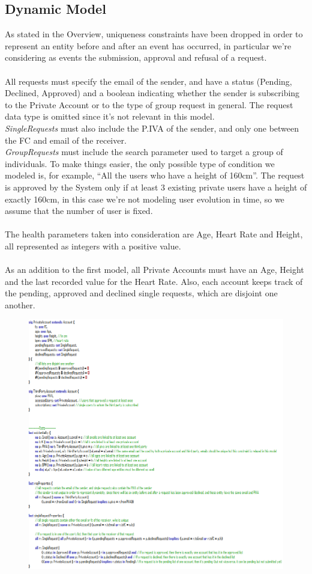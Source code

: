 \documentclass[titlepage]{article}
\begin{document}
		\subsection{Dynamic Model}
		As stated in the Overview, uniqueness constraints have been dropped in order to represent an entity before and 		after an event has occurred, in particular we’re considering as events the submission, approval and refusal of a 		request.\\
		\\
		All requests must specify the email of the sender, and have a status (Pending, Declined, Approved) and a boolean 		indicating whether the sender is subscribing to the Private Account or to the type of group request in general. The 		request data type is omitted since it’s not relevant in this model.\\
		{\it SingleRequests} must also include the P.IVA of the sender, and only one between the FC and email of the 			receiver.\\
		{\it GroupRequests} must include the search parameter used to target a group of individuals. To make things easier, 		the only possible type of condition we modeled is, for example, “All the users who have a height of 160cm”. The 		request is approved by the System only if at least 3 existing private users have a height of exactly 160cm, in this 		case we’re not modeling user evolution in time, so we assume that the number of user is fixed.\\
		\\
		The health parameters taken into consideration are Age, Heart Rate and Height, all represented as integers with a 		positive value.\\
		\\
		As an addition to the first model, all Private Accounts must have an Age, Height and the last recorded value for the 		Heart Rate. Also, each account keeps track of the pending, approved and declined single requests, which are 			disjoint one another.\\	
		\begin{figure}[H]
			\center
  			\includegraphics[width=0.7\columnwidth]{Alloy/Dynamic1.png}
			\label{fig:dyn1}
		\end{figure}
\end{document}
